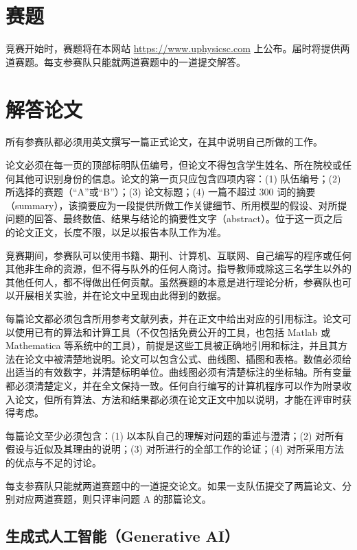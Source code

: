 \documentclass[11pt,a4paper]{ctexart}
\begin{document}
\section{赛题}

竞赛开始时，赛题将在本网站 \url{https://www.uphysicsc.com} 上公布。届时将提供两道赛题。每支参赛队只能就两道赛题中的一道提交解答。

\section{解答论文}

所有参赛队都必须用英文撰写一篇正式论文，在其中说明自己所做的工作。

论文必须在每一页的顶部标明队伍编号，但论文不得包含学生姓名、所在院校或任何其他可识别身份的信息。论文的第一页只应包含四项内容：(1) 队伍编号；(2) 所选择的赛题（“A”或“B”）；(3) 论文标题；(4) 一篇不超过
300 词的摘要（summary），该摘要应为一段提供所做工作关键细节、所用模型的假设、对所提问题的回答、最终数值、结果与结论的摘要性文字（abstract）。位于这一页之后的论文正文，长度不限，以足以报告本队工作为准。

竞赛期间，参赛队可以使用书籍、期刊、计算机、互联网、自己编写的程序或任何其他非生命的资源，但不得与队外的任何人商讨。指导教师或除这三名学生以外的其他任何人，都不得做出任何贡献。虽然赛题的本意是进行理论分析，参赛队也可以开展相关实验，并在论文中呈现由此得到的数据。

每篇论文都必须包含所用参考文献列表，并在正文中给出对应的引用标注。论文可以使用已有的算法和计算工具（不仅包括免费公开的工具，也包括 Matlab 或 Mathematica 等系统中的工具），前提是这些工具被正确地引用和标注，并且其方法在论文中被清楚地说明。论文可以包含公式、曲线图、插图和表格。数值必须给出适当的有效数字，并清楚标明单位。曲线图必须有清楚标注的坐标轴。所有变量都必须清楚定义，并在全文保持一致。任何自行编写的计算机程序可以作为附录收入论文，但所有算法、方法和结果都必须在论文正文中加以说明，才能在评审时获得考虑。

每篇论文至少必须包含：(1) 以本队自己的理解对问题的重述与澄清；(2) 对所有假设与近似及其理由的说明；(3) 对所进行的全部工作的论证；(4) 对所采用方法的优点与不足的讨论。

每支参赛队只能就两道赛题中的一道提交论文。如果一支队伍提交了两篇论文、分别对应两道赛题，则只评审问题
A 的那篇论文。

\subsection*{生成式人工智能（Generative AI）}
\end{document}

